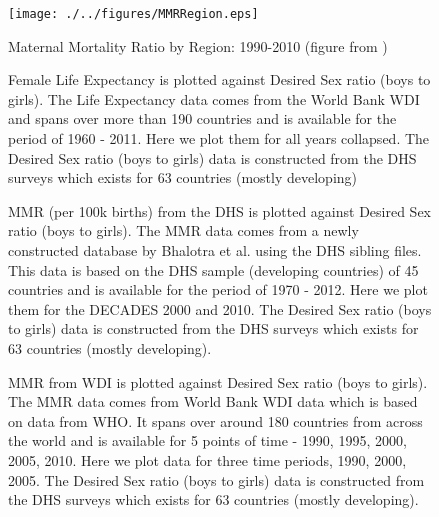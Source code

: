 \documentclass[11pt]{article}
\begin{document}
\begin{spacing}{1.4}
\begin{figure}[htpb!]
\begin{center}
\texttt{[image: ./../figures/MMRRegion.eps]} 
\caption{Maternal Mortality Ratio by Region: 1990-2010 (figure from \citet{BhalotraClarke2013})}
\label{fig:MMRRegion}
\end{center}
\end{figure}

\begin{figure}[htpb!]
\centering
{}
\caption{Female Life Expectancy is plotted against Desired Sex ratio (boys to girls). The Life Expectancy data comes from the World Bank WDI and spans over more than 190 countries and is available for the period of 1960 - 2011. Here we plot them for all years collapsed. The Desired Sex ratio (boys to girls) data is constructed from the DHS surveys which exists for 63 countries (mostly developing)}
\label{LFEgenderbias}
\end{figure}

\begin{figure}[htpb!]
\centering
{}
\caption{MMR (per 100k births) from the DHS is plotted against Desired Sex ratio (boys to girls). The MMR data comes from a newly constructed database by Bhalotra et al. using the DHS sibling files. This data is based on the DHS sample (developing countries) of 45 countries and is available for the period of 1970 - 2012. Here we plot them for the DECADES 2000 and 2010. The Desired Sex ratio (boys to girls) data is constructed from the DHS surveys which exists for 63 countries (mostly developing).}
\label{MMRDgenderbias}
\end{figure}


\begin{figure}[htpb!]
\centering
{}
\caption{MMR from WDI is plotted against Desired Sex ratio (boys to girls). The MMR data comes from World Bank WDI data which is based on data from WHO. It spans over around 180 countries from across the world and is available for 5 points of time - 1990, 1995, 2000, 2005, 2010. Here we plot data for three time periods, 1990, 2000, 2005. The Desired Sex ratio (boys to girls) data is constructed from the DHS surveys which exists for 63 countries (mostly developing). }
\label{MMRWgenderbias}
\end{figure}



\end{spacing}
\end{document}
